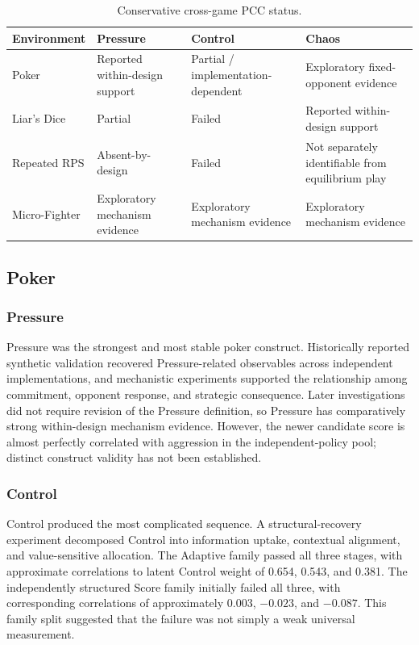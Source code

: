 \documentclass[journal]{IEEEtran}
\begin{document}
\begin{table}[t]
\caption{Conservative cross-game PCC status.}
\label{tab:crossgame}
\centering
\begin{tabular}{lL{3cm}L{5cm}L{5cm}}
\toprule
\textbf{Environment} & \textbf{Pressure} & \textbf{Control} & \textbf{Chaos} \\
\midrule
Poker & Reported within-design support & Partial / implementation-dependent & Exploratory fixed-opponent evidence \\
Liar's Dice & Partial & Failed & Reported within-design support \\
Repeated RPS & Absent-by-design & Failed & Not separately identifiable from equilibrium play \\
Micro-Fighter & Exploratory mechanism evidence & Exploratory mechanism evidence & Exploratory mechanism evidence \\
\bottomrule
\end{tabular}
\end{table}

\subsection{Poker}

\subsubsection{Pressure}

Pressure was the strongest and most stable poker construct. Historically reported synthetic validation recovered Pressure-related observables across independent implementations, and mechanistic experiments supported the relationship among commitment, opponent response, and strategic consequence. Later investigations did not require revision of the Pressure definition, so Pressure has comparatively strong within-design mechanism evidence. However, the newer candidate score is almost perfectly correlated with aggression in the independent-policy pool; distinct construct validity has not been established.

\subsubsection{Control}\label{sec:poker-control}

Control produced the most complicated sequence. A structural-recovery experiment decomposed Control into information uptake, contextual alignment, and value-sensitive allocation. The Adaptive family passed all three stages, with approximate correlations to latent Control weight of 0.654, 0.543, and 0.381. The independently structured Score family initially failed all three, with corresponding correlations of approximately 0.003, $-0.023$, and $-0.087$. This family split suggested that the failure was not simply a weak universal measurement.
\end{document}
